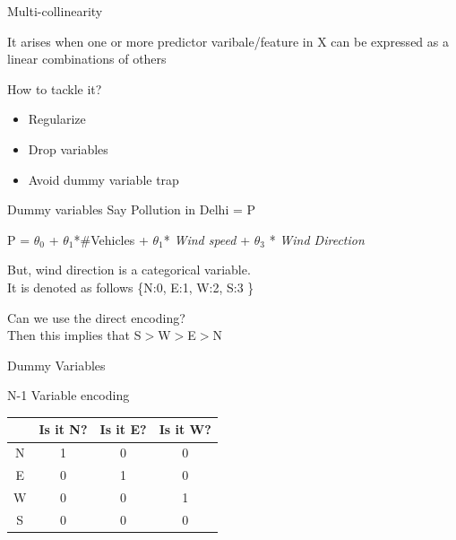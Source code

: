 \documentclass{beamer}
\begin{document}
    
    
    
    
    \begin{frame}{Multi-collinearity}
    
    It arises when one or more predictor varibale/feature in X can be expressed as a linear combinations of others\\
    \vspace{5mm}
    
    
    
    How to tackle it?
    \begin{itemize}
        \item<+-> Regularize
        \item<+-> Drop variables
        \item<+-> Avoid dummy variable trap
    \end{itemize}
    \end{frame}
    \begin{frame}{Dummy variables}
    Say Pollution in Delhi = P
    \pause \begin{center}
        P = $\theta_{0}$ + $\theta_{1}$*\#Vehicles + $\theta_{1}$*
        \textit{Wind speed} + $\theta_{3}$ * \textit{Wind Direction}
    \end{center}
    
    \pause But, wind direction is a categorical variable. \\
    \pause It is denoted as follows \{N:0, E:1, W:2, S:3 \}\\
    \vspace{3em}
    
    \pause Can we use the direct encoding? \\
    \pause Then this implies that S$>$W$>$E$>$N
    \end{frame}
    
    \begin{frame}{Dummy Variables}
    \begin{center}
    
    N-1 Variable encoding\\
    \vspace{1em}
    \begin{tabular}{|c|c|c|c|}
        \hline
        & Is it N? &Is it E? &Is it W?\\
        \hline
        \hline
        N & 1&0&0 \\
        E & 0&1&0\\
        W & 0&0&1\\
        S & 0&0&0\\
        \hline
    \end{tabular}
    
    \end{center}
    \end{frame}
    
\end{document}
